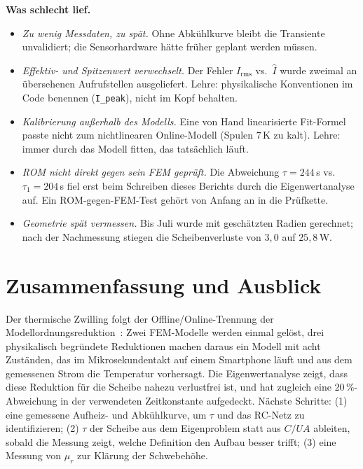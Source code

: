 \documentclass[a4paper, 10pt, conference]{ieeeconf}
\theoremstyle{remark}
\begin{document}
\textbf{Was schlecht lief.}
\begin{itemize}[leftmargin=*, nosep]
  \item \emph{Zu wenig Messdaten, zu spät.} Ohne Abkühlkurve bleibt die
        Transiente unvalidiert; die Sensorhardware hätte früher
        geplant werden müssen.
  \item \emph{Effektiv- und Spitzenwert verwechselt.} Der Fehler
        $I_{\mathrm{rms}}$ vs.\ $\hat I$ wurde zweimal an übersehenen
        Aufrufstellen ausgeliefert. Lehre: physikalische Konventionen im
        Code benennen (\texttt{I\_peak}), nicht im Kopf behalten.
  \item \emph{Kalibrierung außerhalb des Modells.} Eine von Hand
        linearisierte Fit-Formel passte nicht zum nichtlinearen
        Online-Modell (Spulen $7\,$K zu kalt). Lehre: immer durch das
        Modell fitten, das tatsächlich läuft.
  \item \emph{ROM nicht direkt gegen sein FEM geprüft.} Die Abweichung
        $\tau=244\,$s vs.\ $\tau_1=204\,$s fiel erst beim Schreiben
        dieses Berichts durch die Eigenwertanalyse auf. Ein
        ROM-gegen-FEM-Test gehört von Anfang an in die Prüfkette.
  \item \emph{Geometrie spät vermessen.} Bis Juli wurde mit geschätzten
        Radien gerechnet; nach der Nachmessung stiegen die Scheibenverluste
        von $3{,}0$ auf $25{,}8\,$W.
\end{itemize}

\section{Zusammenfassung und Ausblick}
\label{sec:summary}

Der thermische Zwilling folgt der Offline/Online-Trennung der
Modellordnungsreduktion~\cite{hartmann2018mor}: Zwei FEM-Modelle werden
einmal gelöst, drei physikalisch begründete Reduktionen machen daraus ein
Modell mit acht Zuständen, das im Mikrosekundentakt auf einem Smartphone
läuft und aus dem gemessenen Strom die Temperatur vorhersagt. Die
Eigenwertanalyse zeigt, dass diese Reduktion für die Scheibe nahezu
verlustfrei ist, und hat zugleich eine $20\,\%$-Abweichung in der
verwendeten Zeitkonstante aufgedeckt. Nächste Schritte: (1) eine gemessene
Aufheiz- und Abkühlkurve, um $\tau$ und das RC-Netz zu identifizieren;
(2) $\tau$ der Scheibe aus dem Eigenproblem statt aus $C/UA$ ableiten,
sobald die Messung zeigt, welche Definition den Aufbau besser trifft;
(3) eine Messung von $\mu_r$ zur Klärung der Schwebehöhe.



\end{document}
